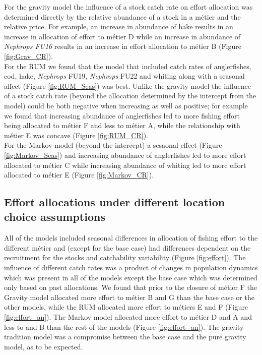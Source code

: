 \documentclass[12pt, halfline, a4paper]{ouparticle}
\begin{document}
For the gravity model the influence of a stock catch rate on effort allocation
was determined directly by the relative abundance of a stock in a métier and
the relative price. For example, an increase in abundance of hake results in an
increase in allocation of effort to métier D while an increase in abundance of
\textit{Nephrops FU16} results in an increase in effort allocation to métier B
(Figure \ref{fig:Grav_CR}). \\

For the RUM we found that the model that included catch rates of anglerfishes,
cod, hake, \textit{Nephrops} FU19, \textit{Nephrops} FU22 and whiting along
with a seasonal affect (Figure \ref{fig:RUM_Seas}) was best. Unlike the gravity
model the influence of a stock catch rate (beyond the allocation determined by
the intercept from the model) could be both negative when increasing as well as
positive; for example we found that increasing abundance of anglerfishes led to
more fishing effort being allocated to métier F and less to métier A, while the
relationship with métier E was concave (Figure \ref{fig:RUM_CR}). \\

For the Markov model (beyond the intercept) a sesaonal effect (Figure
\ref{fig:Markov_Seas}) and increasing abundance of anglerfishes led to more
effort allocated to métier C while increasing abundance of whiting led to more
effort allocated to métier E (Figure \ref{fig:Markov_CR}).

\subsection{Effort allocations under different location choice assumptions}

All of the models included seasonal differences in allocation of fishing effort
to the different métier and (except for the base case) had differences
dependent on the recruitment for the stocks and catchability variability
(Figure \ref{fig:effort}). The influence of different catch rates was a product
of changes in population dynamics which was present in all of the models except
the base case which was determined only based on past allocations. We found
that prior to the closure of métier F the Gravity model allocated more effort
to métier B and G than the base case or the other models, while the RUM
allocated more effort to métiers E and F (Figure \ref{fig:effort_an}). The
Markov model allocated more effort to métier D and A and less to and B than the
rest of the models (Figure \ref{fig:effort_an}). The gravity-tradition model
was a compromise between the base case and the pure gravity model, as to be
expected. \\
\end{document}
